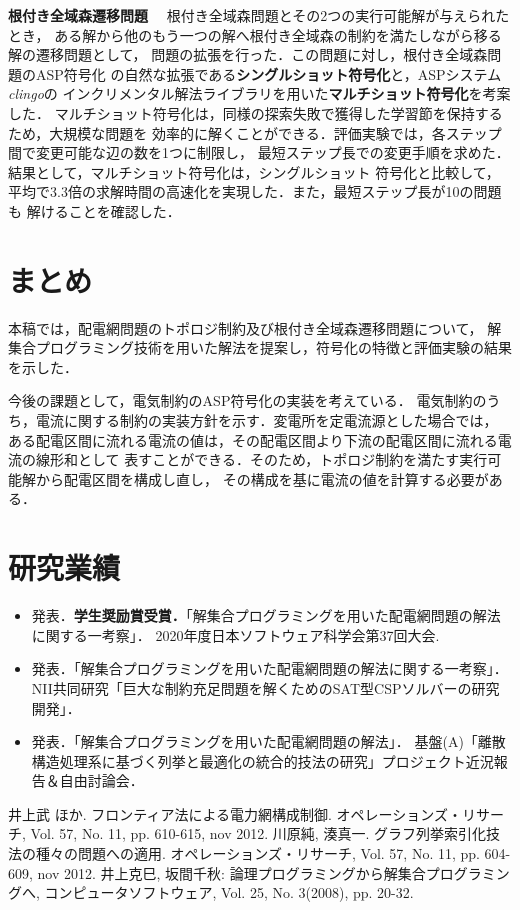 \documentclass[a4j,10pt,dvipdfmx]{jarticle}
\newcommand{\mysection}[1]{\vspace{-15pt}\section{#1}}
\begin{document}
\begin{multicols}{1}
\textbf{根付き全域森遷移問題}~~
根付き全域森問題とその2つの実行可能解が与えられたとき，
ある解から他のもう一つの解へ根付き全域森の制約を満たしながら移る解の遷移問題として，
問題の拡張を行った．この問題に対し，根付き全域森問題のASP符号化
の自然な拡張である\textbf{シングルショット符号化}と，ASPシステム\textit{clingo}の
インクリメンタル解法ライブラリを用いた\textbf{マルチショット符号化}を考案した．
マルチショット符号化は，同様の探索失敗で獲得した学習節を保持するため，大規模な問題を
効率的に解くことができる．評価実験では，各ステップ間で変更可能な辺の数を1つに制限し，
最短ステップ長での変更手順を求めた．結果として，マルチショット符号化は，シングルショット
符号化と比較して，平均で3.3倍の求解時間の高速化を実現した．また，最短ステップ長が10の問題も
解けることを確認した．

\mysection{まとめ}
本稿では，配電網問題のトポロジ制約及び根付き全域森遷移問題について，
解集合プログラミング技術を用いた解法を提案し，符号化の特徴と評価実験の結果を示した．

今後の課題として，電気制約のASP符号化の実装を考えている．
電気制約のうち，電流に関する制約の実装方針を示す．変電所を定電流源とした場合では，
ある配電区間に流れる電流の値は，その配電区間より下流の配電区間に流れる電流の線形和として
表すことができる．そのため，トポロジ制約を満たす実行可能解から配電区間を構成し直し，
その構成を基に電流の値を計算する必要がある．

\mysection{研究業績}
\begin{itemize}
 \setlength{\parskip}{0pt} %
 \setlength{\itemsep}{2pt} %
 \small
 \item 発表．\textbf{学生奨励賞受賞．}「解集合プログラミングを用いた配電網問題の解法に関する一考察」．
	   2020年度日本ソフトウェア科学会第37回大会. 
 \item 発表．「解集合プログラミングを用いた配電網問題の解法に関する一考察」．
	   NII共同研究「巨大な制約充足問題を解くためのSAT型CSPソルバーの研究開発」．
 \item 発表．「解集合プログラミングを用いた配電網問題の解法」．
	   基盤(A)「離散構造処理系に基づく列挙と最適化の統合的技法の研究」プロジェクト近況報告＆自由討論会．
\end{itemize}


%  

\begin{thebibliography}{10}
\small
\setlength{\itemsep}{-2pt} 
 井上武 ほか. フロンティア法による電力網構成制御. 
		 オペレーションズ・リサーチ, Vol. 57, No. 11, pp. 610-615, nov 2012.
 川原純, 湊真一. グラフ列挙索引化技法の種々の問題への適用. 
		 オペレーションズ・リサーチ, Vol. 57, No. 11, pp. 604-609, nov 2012. 
 井上克巳, 坂間千秋: 論理プログラミングから解集合プログラミングへ, 
		 コンピュータソフトウェア, Vol. 25, No. 3(2008), pp. 20-32.
\end{thebibliography}

\end{multicols}
\end{document}
